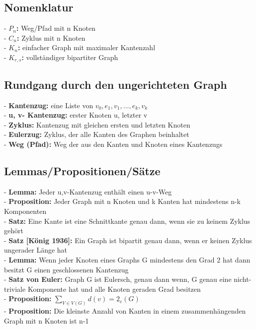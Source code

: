 \documentclass{article}
\begin{document}
\begin{multicols*}{3}
    \subsection{Nomenklatur}
        - \textbf{$P_n$:} Weg/Pfad mit n Knoten
        \\- \textbf{$C_n$:} Zyklus mit n Knoten
        \\- \textbf{$K_n$:} einfacher Graph mit maximaler Kantenzahl
        \\- \textbf{$K_{r, s}$:} vollständiger bipartiter Graph
    \subsection{Rundgang durch den ungerichteten Graph}
        - \textbf{Kantenzug:} eine Liste von $v_0, e_1, v_1, ..., e_k, v_k$
        \\- \textbf{u, v- Kantenzug:} erster Knoten u,  letzter v
        \\- \textbf{Zyklus:} Kantenzug mit gleichen ersten und letzten Knoten
        \\- \textbf{Eulerzug:} Zyklus, der alle Kanten des Graphen beinhaltet
        \\- \textbf{ Weg (Pfad):} Weg der aus den Kanten und Knoten eines Kantenzugs
    \subsection{Lemmas/Propositionen/Sätze}
        - \textbf{Lemma:} Jeder u,v-Kantenzug enthält einen u-v-Weg
        \\- \textbf{Proposition:} Jeder Graph mit n Knoten und k Kanten hat mindestens n-k Komponenten
        \\- \textbf{Satz:} Eine Kante ist eine Schnittkante genau dann, wenn sie zu keinem Zyklus gehört
        \\- \textbf{Satz [König 1936]:} Ein Graph ist bipartit genau dann, wenn er keinen Zyklus ungerader Länge hat
        \\- \textbf{Lemma:} Wenn jeder Knoten eines Graphs G mindestens den Grad 2 hat dann besitzt G einen geschlossenen Kantenzug
        \\- \textbf{Satz von Euler:} Graph G ist Eulersch, genau dann wenn, G genau eine nicht-triviale Komponente hat und alle Knoten geraden Grad besitzen
        \\- \textbf{Proposition:} $\sum_{V \in V(G)} d(v) = 2_e(G)$
        \\- \textbf{Proposition:} Die kleinste Anzahl von Kanten in einem zusammenhängenden Graph mit n Knoten ist n-1

\end{multicols*}
\end{document}
